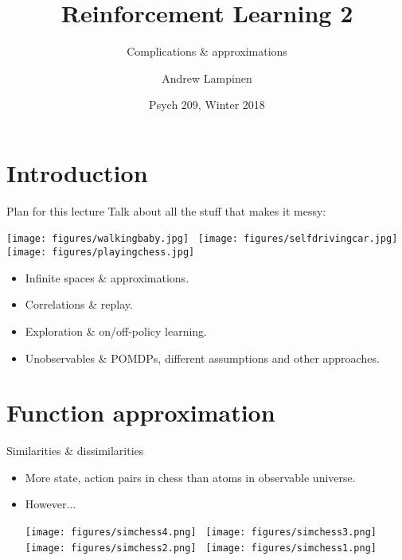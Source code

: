 \documentclass{beamer}
\begin{document}
\title{Reinforcement Learning 2}
\subtitle{Complications \& approximations}
\author{Andrew Lampinen}
\date{Psych 209, Winter 2018}
\frame{\titlepage}


\section{Introduction}
\begin{frame}{Plan for this lecture}
Talk about all the stuff that makes it messy: 
\begin{center}
    \texttt{[image: figures/walkingbaby.jpg]}~
    \texttt{[image: figures/selfdrivingcar.jpg]}~
    \texttt{[image: figures/playingchess.jpg]}
\end{center}
\begin{itemize}
    \item<2-> Infinite spaces \& approximations.
    \item<3-> Correlations \& replay.
    \item<4-> Exploration \& on/off-policy learning.
    \item<5-> Unobservables \& POMDPs, different assumptions and other approaches.
\end{itemize}
\end{frame}

\section{Function approximation}

\begin{frame}{Similarities \& dissimilarities}
\begin{itemize}
    \item More state, action pairs in chess than atoms in observable universe. 
    \item<2-> However... 
    \begin{center}
        \texttt{[image: figures/simchess4.png]}~
        \texttt{[image: figures/simchess3.png]} \\[5pt]
        \texttt{[image: figures/simchess2.png]}~
        \texttt{[image: figures/simchess1.png]}
    \end{center}
\end{itemize}
\end{frame}
\end{document}
